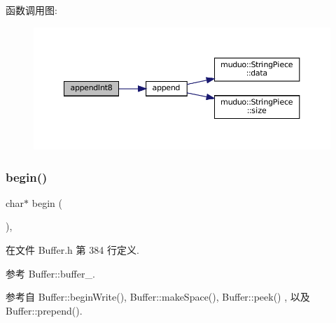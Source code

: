 函数调用图\+:
\nopagebreak
\begin{figure}[H]
\begin{center}
\leavevmode
\includegraphics[width=350pt]{classmuduo_1_1net_1_1Buffer_a9dca0171bcc73c002095487c464bad28_cgraph}
\end{center}
\end{figure}
\mbox{\label{classmuduo_1_1net_1_1Buffer_ad431daee7daddf53f8aca682ddf3c940}} 
\subsubsection{\texorpdfstring{begin()}{begin()}\hspace{0.1cm}{\footnotesize\ttfamily [1/2]}}
{\footnotesize\ttfamily char$\ast$ begin (\begin{DoxyParamCaption}{ }\end{DoxyParamCaption})\hspace{0.3cm}{\ttfamily [inline]}, {\ttfamily [private]}}



在文件 Buffer.\+h 第 384 行定义.



参考 Buffer\+::buffer\+\_\+.



参考自 Buffer\+::begin\+Write(), Buffer\+::make\+Space(), Buffer\+::peek() , 以及 Buffer\+::prepend().

